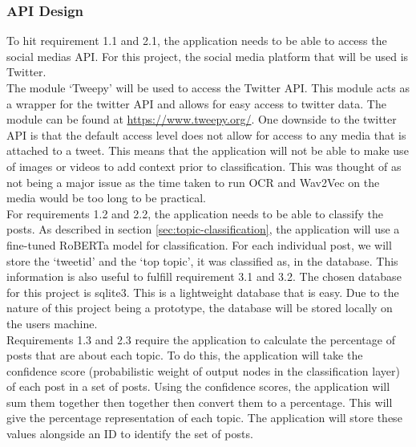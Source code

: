 \subsubsection{API Design}
To hit requirement 1.1 and 2.1, the application needs to be able to access the social medias API. For this project, the social media
platform that will be used is Twitter.\\
The module `Tweepy' will be used to access the Twitter API. This module acts as a wrapper for the twitter API and allows for easy
access to twitter data. The module can be found at \url{https://www.tweepy.org/}. One downside to the twitter API is that the default
access level does not allow for access to any media that is attached to a tweet. This means that the application will not be able to
make use of images or videos to add context prior to classification. This was thought of as not being a major issue as the time taken
to run OCR and Wav2Vec on the media would be too long to be practical.\\

For requirements 1.2 and 2.2, the application needs to be able to classify the posts. As described in section \ref{sec:topic-classification},
the application will use a fine-tuned RoBERTa model for classification. For each individual post, we will store the `tweetid' and the
`top topic', it was classified as, in the database. This information is also useful to fulfill requirement 3.1 and 3.2. The chosen database
for this project is sqlite3. This is a lightweight database that is easy. Due to the nature of this project being a prototype, the database
will be stored locally on the users machine.\\

Requirements 1.3 and 2.3 require the application to calculate the percentage of posts that are about each topic. To do this, the application
will take the confidence score (probabilistic weight of output nodes in the classification layer) of each post in a set of posts. Using the
confidence scores, the application will sum them together then together then convert them to a percentage. This will give the percentage
representation of each topic. The application will store these values alongside an ID to identify the set of posts.\\

